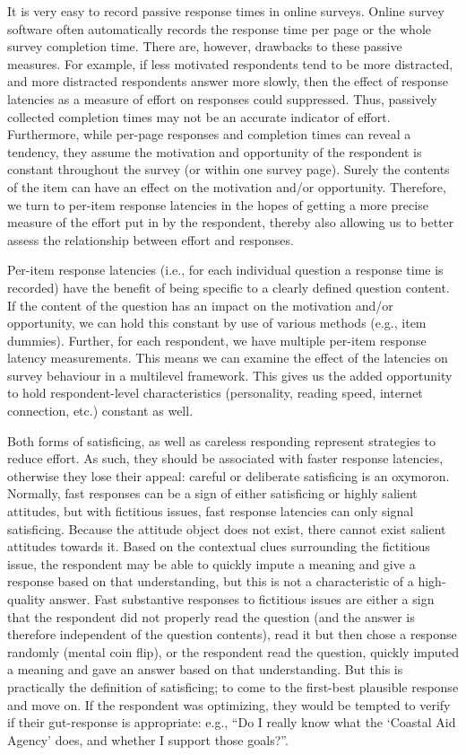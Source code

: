 \documentclass[Royal,times,sageh]{sagej}
\begin{document}
It is very easy to record passive response times in online surveys.
Online survey software often automatically records the response time per
page or the whole survey completion time. There are, however, drawbacks
to these passive measures. For example, if less motivated respondents
tend to be more distracted, and more distracted respondents answer more
slowly, then the effect of response latencies as a measure of effort on
responses could suppressed. Thus, passively collected completion times
may not be an accurate indicator of effort. Furthermore, while per-page
responses and completion times can reveal a tendency, they assume the
motivation and opportunity of the respondent is constant throughout the
survey (or within one survey page). Surely the contents of the item can
have an effect on the motivation and/or opportunity. Therefore, we turn
to per-item response latencies in the hopes of getting a more precise
measure of the effort put in by the respondent, thereby also allowing us
to better assess the relationship between effort and responses.

Per-item response latencies (i.e., for each individual question a
response time is recorded) have the benefit of being specific to a
clearly defined question content. If the content of the question has an
impact on the motivation and/or opportunity, we can hold this constant
by use of various methods (e.g., item dummies). Further, for each
respondent, we have multiple per-item response latency measurements.
This means we can examine the effect of the latencies on survey
behaviour in a multilevel framework. This gives us the added opportunity
to hold respondent-level characteristics (personality, reading speed,
internet connection, etc.) constant as well.

Both forms of satisficing, as well as careless responding represent
strategies to reduce effort. As such, they should be associated with
faster response latencies, otherwise they lose their appeal: careful or
deliberate satisficing is an oxymoron. Normally, fast responses can be a
sign of either satisficing or highly salient attitudes, but with
fictitious issues, fast response latencies can only signal satisficing.
Because the attitude object does not exist, there cannot exist salient
attitudes towards it. Based on the contextual clues surrounding the
fictitious issue, the respondent may be able to quickly impute a meaning
and give a response based on that understanding, but this is not a
characteristic of a high-quality answer. Fast substantive responses to
fictitious issues are either a sign that the respondent did not properly
read the question (and the answer is therefore independent of the
question contents), read it but then chose a response randomly (mental
coin flip), or the respondent read the question, quickly imputed a
meaning and gave an answer based on that understanding. But this is
practically the definition of satisficing; to come to the first-best
plausible response and move on. If the respondent was optimizing, they
would be tempted to verify if their gut-response is appropriate: e.g.,
``Do I really know what the `Coastal Aid Agency' does, and whether I
support those goals?''.
\end{document}
